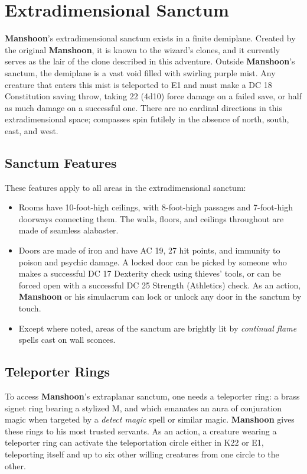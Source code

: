 \documentclass[10pt,a4paper,twoside,twocolumn,openany,nodeprecatedcode]{dndbook}
\begin{document}
\section{Extradimensional Sanctum}
\textbf{Manshoon}'s extradimensional sanctum exists in a finite demiplane. Created by the original \textbf{Manshoon}, it is known to the wizard's clones, and it currently serves as the lair of the clone described in this adventure.
Outside \textbf{Manshoon}'s sanctum, the demiplane is a vast void filled with swirling purple mist. Any creature that enters this mist is teleported to E1 and must make a DC 18 Constitution saving throw, taking 22 (4d10) force damage on a failed save, or half as much damage on a successful one.
There are no cardinal directions in this extradimensional space; compasses spin futilely in the absence of north, south, east, and west.
\subsection{Sanctum Features}
These features apply to all areas in the extradimensional sanctum:
\begin{itemize}

\item Rooms have 10-foot-high ceilings, with 8-foot-high passages and 7-foot-high doorways connecting them. The walls, floors, and ceilings throughout are made of seamless alabaster.
\item Doors are made of iron and have AC 19, 27 hit points, and immunity to poison and psychic damage. A locked door can be picked by someone who makes a successful DC 17 Dexterity check using thieves' tools, or can be forced open with a successful DC 25 Strength (Athletics) check. As an action, \textbf{Manshoon} or his simulacrum can lock or unlock any door in the sanctum by touch.
\item Except where noted, areas of the sanctum are brightly lit by \textit{continual flame} spells cast on wall sconces.
\end{itemize}


\subsection{Teleporter Rings}
To access \textbf{Manshoon}'s extraplanar sanctum, one needs a teleporter ring: a brass signet ring bearing a stylized M, and which emanates an aura of conjuration magic when targeted by a \textit{detect magic} spell or similar magic. \textbf{Manshoon} gives these rings to his most trusted servants.
As an action, a creature wearing a teleporter ring can activate the teleportation circle either in K22 or E1, teleporting itself and up to six other willing creatures from one circle to the other.
\end{document}
